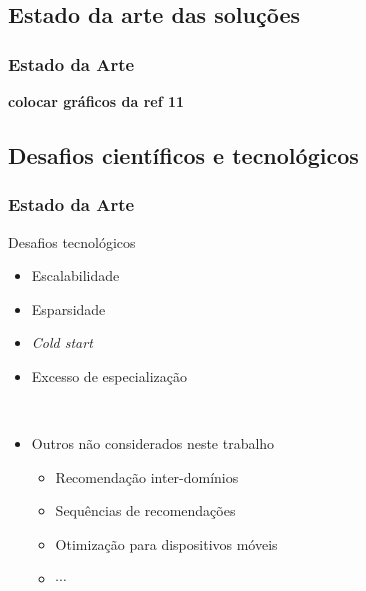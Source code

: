 \subsection{Estado da arte das soluções} %
\label{sub:estado_da_arte_das_solu_es_}
\begin{frame}
\frametitle{Estado da Arte}

\textbf{colocar gráficos da ref 11}
\end{frame}


\subsection{Desafios científicos e tecnológicos} %
\label{sub:desafios_cient_ficos_e_tecnol_gicos_}

\begin{frame}
\frametitle{Estado da Arte}
\begin{block}{Desafios tecnológicos}
\begin{itemize}
	\item Escalabilidade
	\item Esparsidade
	\item \textit{Cold start}
	\item Excesso de especialização \par{~}
	\item Outros não considerados neste trabalho
	\begin{itemize}
		\item Recomendação inter-domínios
		\item Sequências de recomendações
		\item Otimização para dispositivos móveis
		\item $\cdots$
	\end{itemize}
\end{itemize}
\end{block}
\end{frame}